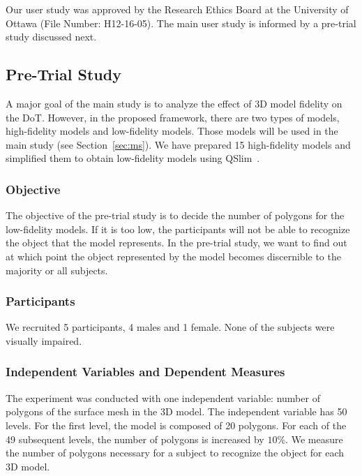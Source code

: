 Our user study was approved by the Research Ethics Board at the University of Ottawa (File Number: H12-16-05).
The main user study is informed by a pre-trial study discussed next.

\subsection{Pre-Trial Study}
\label{sec:pts}

A major goal of the main study is to analyze the effect of 3D model fidelity on the DoT. However, in the proposed framework, there are two types of models, high-fidelity models and low-fidelity models. Those models will be used in the main study (see Section~\ref{sec:ms}). We have prepared 15 high-fidelity models and simplified them to obtain low-fidelity models using QSlim~\cite{garland1997}.

\subsubsection{Objective}

The objective of the pre-trial study is to decide the number of polygons for the low-fidelity models. If it is too low, the participants will not be able to recognize the object that the model represents. In the pre-trial study, we want to find out at which point the object represented by the model becomes discernible to the majority or all subjects.

\subsubsection{Participants}

We recruited 5 participants, 4 males and 1 female. None of the subjects were visually impaired.

\subsubsection{Independent Variables and Dependent Measures}
\label{sec:ivdm}

The experiment was conducted with one independent variable: number of polygons of the surface mesh in the 3D model.
The independent variable has 50 levels. For the first level, the model is composed of 20 polygons. For each of the 49 subsequent levels, the number of polygons is increased by $10\%$. We measure the number of polygons necessary for a subject to recognize the object for each 3D model.

